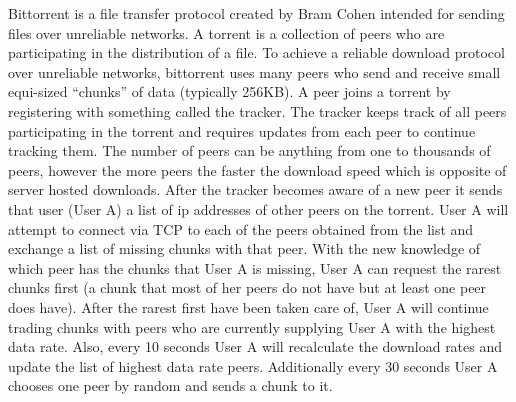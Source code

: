 \documentclass[letter]{scrartcl}
\begin{document}
Bittorrent is a file transfer protocol created by Bram Cohen intended for sending files over unreliable networks.  A torrent is a collection of peers who are participating in the distribution of a file.  To achieve a reliable download protocol over unreliable networks, bittorrent uses many peers who send and receive small equi-sized “chunks” of data (typically 256KB).  A peer joins a torrent by registering with something called the tracker.  The tracker keeps track of all peers participating in the torrent and requires updates from each peer to continue tracking them.  The number of peers can be anything from one to thousands of peers, however the more peers the faster the download speed which is opposite of server hosted downloads.  After the tracker becomes aware of a new peer it sends that user (User A) a list of ip addresses of other peers on the torrent.  User A will attempt to connect via TCP to each of the peers obtained from the list and exchange a list of missing chunks with that peer.  With the new knowledge of which peer has the chunks that User A is missing, User A can request the rarest chunks first (a chunk that most of her peers do not have but at least one peer does have).  After the rarest first have been taken care of, User A will continue trading chunks with peers who are currently supplying User A with the highest data rate.  Also, every 10 seconds User A will recalculate the download rates and update the list of highest data rate peers.  Additionally every 30 seconds User A chooses one peer by random and sends a chunk to it. 
\end{document}
